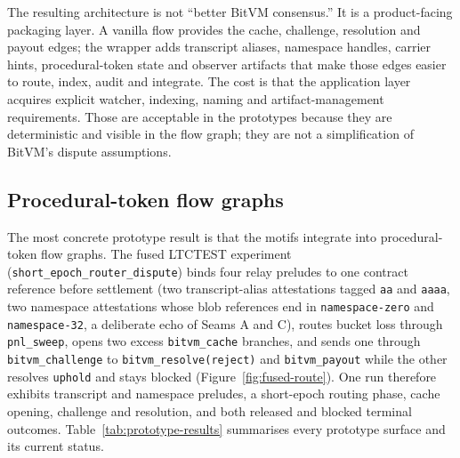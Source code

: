 \documentclass[11pt]{article}
\begin{document}
The resulting architecture is not ``better BitVM consensus.'' It is a
product-facing packaging layer. A vanilla flow provides the cache, challenge,
resolution and payout edges; the wrapper adds transcript aliases, namespace
handles, carrier hints, procedural-token state and observer artifacts that make
those edges easier to route, index, audit and integrate. The cost is that the
application layer acquires explicit watcher, indexing, naming and
artifact-management requirements. Those are acceptable in the prototypes because
they are deterministic and visible in the flow graph; they are not a
simplification of BitVM's dispute assumptions.

\subsection{Procedural-token flow graphs}

The most concrete prototype result is that the motifs integrate into
procedural-token flow graphs. The fused LTCTEST experiment
(\texttt{short\_epoch\_router\_dispute}) binds four relay preludes to one
contract reference before settlement (two transcript-alias attestations tagged
\texttt{aa} and \texttt{aaaa}, two namespace attestations whose blob references
end in \texttt{namespace-zero} and \texttt{namespace-32}, a deliberate echo of
Seams A and C), routes bucket loss through \texttt{pnl\_sweep}, opens two
excess \texttt{bitvm\_cache} branches, and sends one through
\texttt{bitvm\_challenge} to \texttt{bitvm\_resolve(reject)} and
\texttt{bitvm\_payout} while the other resolves \texttt{uphold} and stays
blocked (Figure~\ref{fig:fused-route}). One run therefore exhibits transcript
and namespace preludes, a short-epoch routing phase, cache opening, challenge and
resolution, and both released and blocked terminal outcomes.
Table~\ref{tab:prototype-results} summarises every prototype surface and its
current status.
\end{document}
